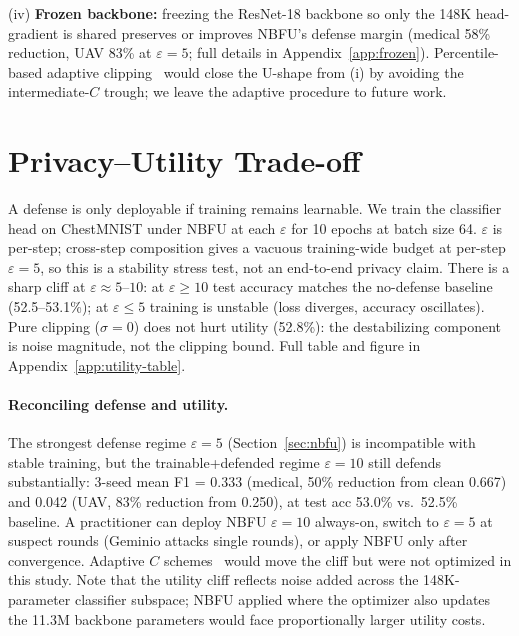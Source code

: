 \documentclass[11pt]{article}
\begin{document}
(iv) \textbf{Frozen backbone:} freezing the ResNet-18 backbone so only the 148K head-gradient is shared preserves or improves NBFU's defense margin (medical 58\% reduction, UAV 83\% at $\varepsilon{=}5$; full details in Appendix~\ref{app:frozen}). Percentile-based adaptive clipping~\citep{andrew2021adaptive} would close the U-shape from (i) by avoiding the intermediate-$C$ trough; we leave the adaptive procedure to future work.


\section{Privacy--Utility Trade-off}
\label{sec:utility}

A defense is only deployable if training remains learnable. We train the classifier head on ChestMNIST under NBFU at each $\varepsilon$ for 10 epochs at batch size 64. $\varepsilon$ is per-step; cross-step composition gives a vacuous training-wide budget at per-step $\varepsilon{=}5$, so this is a stability stress test, not an end-to-end privacy claim. There is a sharp cliff at $\varepsilon{\approx}5$--$10$: at $\varepsilon{\ge}10$ test accuracy matches the no-defense baseline (52.5--53.1\%); at $\varepsilon{\le}5$ training is unstable (loss diverges, accuracy oscillates). Pure clipping ($\sigma{=}0$) does not hurt utility (52.8\%): the destabilizing component is noise magnitude, not the clipping bound. Full table and figure in Appendix~\ref{app:utility-table}.

\paragraph{Reconciling defense and utility.}
The strongest defense regime $\varepsilon{=}5$ (Section~\ref{sec:nbfu}) is incompatible with stable training, but the trainable+defended regime $\varepsilon{=}10$ still defends substantially: 3-seed mean F1 = 0.333 (medical, 50\% reduction from clean 0.667) and 0.042 (UAV, 83\% reduction from 0.250), at test acc 53.0\% vs.\ 52.5\% baseline. A practitioner can deploy NBFU $\varepsilon{=}10$ always-on, switch to $\varepsilon{=}5$ at suspect rounds (Geminio attacks single rounds), or apply NBFU only after convergence. Adaptive $C$ schemes~\citep{andrew2021adaptive} would move the cliff but were not optimized in this study. Note that the utility cliff reflects noise added across the 148K-parameter classifier subspace; NBFU applied where the optimizer also updates the 11.3M backbone parameters would face proportionally larger utility costs.
\end{document}
